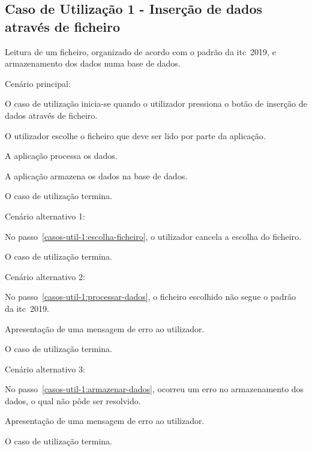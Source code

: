 \subsection*{Caso de Utilização 1 - Inserção de dados através de ficheiro}
Leitura de um ficheiro, organizado de acordo com o padrão da \gls{itc}~2019, e armazenamento dos dados numa base de dados.

Cenário principal:

\begin{compactenum}
    \item O caso de utilização inicia-se quando o utilizador pressiona o botão de inserção de dados através de ficheiro.
    \item O utilizador escolhe o ficheiro que deve ser lido por parte da aplicação. \label{casos-util-1:escolha-ficheiro}
    \item A aplicação processa os dados. \label{casos-util-1:processar-dados}
    \item A aplicação armazena os dados na base de dados. \label{casos-util-1:armazenar-dados}
    \item O caso de utilização termina.
\end{compactenum}

Cenário alternativo 1:

\begin{compactenum}
    \item No passo~\ref{casos-util-1:escolha-ficheiro}, o utilizador cancela a escolha do ficheiro.
    \item O caso de utilização termina.
\end{compactenum}

Cenário alternativo 2:

\begin{compactenum}
    \item No passo~\ref{casos-util-1:processar-dados}, o ficheiro escolhido não segue o padrão da \gls{itc}~2019.
    \item Apresentação de uma mensagem de erro ao utilizador.
    \item O caso de utilização termina.
\end{compactenum}

Cenário alternativo 3:

\begin{compactenum}
    \item No passo~\ref{casos-util-1:armazenar-dados}, ocorreu um erro no armazenamento dos dados, o qual não pôde ser resolvido.
    \item Apresentação de uma mensagem de erro ao utilizador.
    \item O caso de utilização termina.
\end{compactenum}

